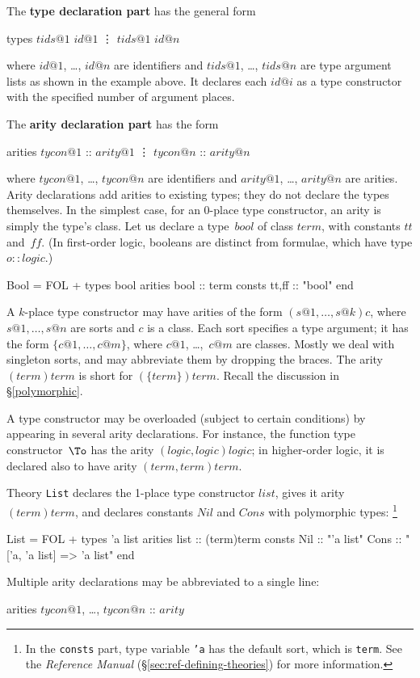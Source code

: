 The {\bf type declaration part} has the general form
\begin{ttbox}
types   \(tids@1\) \(id@1\)
        \vdots
        \(tids@1\) \(id@n\)
\end{ttbox}
where $id@1$, \ldots, $id@n$ are identifiers and $tids@1$, \ldots, $tids@n$
are type argument lists as shown in the example above.  It declares each
$id@i$ as a type constructor with the specified number of argument places.

The {\bf arity declaration part} has the form
\begin{ttbox}
arities \(tycon@1\) :: \(arity@1\)
        \vdots
        \(tycon@n\) :: \(arity@n\)
\end{ttbox}
where $tycon@1$, \ldots, $tycon@n$ are identifiers and $arity@1$, \ldots,
$arity@n$ are arities.  Arity declarations add arities to existing
types; they do not declare the types themselves.
In the simplest case, for an 0-place type constructor, an arity is simply
the type's class.  Let us declare a type~$bool$ of class $term$, with
constants $tt$ and~$ff$.  (In first-order logic, booleans are
distinct from formulae, which have type $o::logic$.)
\begin{ttbox}
Bool = FOL +
types   bool
arities bool    :: term
consts  tt,ff   :: "bool"
end
\end{ttbox}
A $k$-place type constructor may have arities of the form
$(s@1,\ldots,s@k)c$, where $s@1,\ldots,s@n$ are sorts and $c$ is a class.
Each sort specifies a type argument; it has the form $\{c@1,\ldots,c@m\}$,
where $c@1$, \dots,~$c@m$ are classes.  Mostly we deal with singleton
sorts, and may abbreviate them by dropping the braces.  The arity
$(term)term$ is short for $(\{term\})term$.  Recall the discussion in
\S\ref{polymorphic}.

A type constructor may be overloaded (subject to certain conditions) by
appearing in several arity declarations.  For instance, the function type
constructor~$\To$ has the arity $(logic,logic)logic$; in higher-order
logic, it is declared also to have arity $(term,term)term$.

Theory {\tt List} declares the 1-place type constructor $list$, gives
it arity $(term)term$, and declares constants $Nil$ and $Cons$ with
polymorphic types:%
\footnote{In the {\tt consts} part, type variable {\tt'a} has the default
  sort, which is {\tt term}.  See the {\em Reference Manual\/}
%
{(\S\ref{sec:ref-defining-theories})} for more information.}
\begin{ttbox}
List = FOL +
types   'a list
arities list    :: (term)term
consts  Nil     :: "'a list"
        Cons    :: "['a, 'a list] => 'a list" 
end
\end{ttbox}
Multiple arity declarations may be abbreviated to a single line:
\begin{ttbox}
arities \(tycon@1\), \ldots, \(tycon@n\) :: \(arity\)
\end{ttbox}

